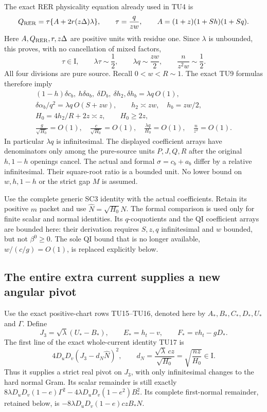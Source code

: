 The exact RER physicality equation already used in TU4 is
\[
 Q_{\rm RER}=\tau\{A+2r(z\Delta)\lambda\},\qquad
 \tau=\frac q{zw},\qquad
 A=(1+z)(1+Sh)(1+Sq).
\]
Here $A,Q_{\rm RER},r,z\Delta$ are positive units with residue one.
Since $\lambda$ is unbounded, this proves, with no cancellation of
mixed factors,
\[
 \tau\in\mathrm I,\qquad \lambda\tau\sim\frac12,\qquad
 \lambda q\sim\frac{zw}{2},\qquad
 \frac n{z^2w}\sim\frac12.                                     \tag{UL2}
\]
All four divisions are pure source. Recall $0<w<R\sim1$.
The exact TU9 formulas therefore imply
\[
\begin{gathered}
 (1-h)\delta c_b,\ h\delta a_b,\ \delta D_b,\
            \delta h_2,\delta h_b=\lambda q\,O(1),\\
 \delta\alpha_b/q^2=\lambda q\,O(S+zw),\qquad
 h_2\asymp zw,\quad h_b=zw/2,\\
 H_0=4h_2/R+2z\asymp z,\qquad H_0\geq2z,\\
 \frac g{\sqrt{H_0}}=O(1),\quad
 \frac c{\sqrt{H_0}}=O(1),\quad
 \frac{\lambda q}{H_0}=O(1),\quad \frac n{z^2}=O(1).
\end{gathered}                                                   \tag{UL3}
\]
In particular $\lambda q$ is infinitesimal. The displayed coefficient
arrays have denominators only among the pure-source units
$P,J,Q,R$ after the original $h,1-h$ openings cancel.
The actual and formal $\sigma=c_b+a_b$ differ by a relative
infinitesimal. Their square-root ratio is a bounded unit.
No lower bound on $w,h,1-h$ or the strict gap $M$ is assumed.

Use the complete generic SC3 identity with the actual coefficients.
Retain its positive $m$ packet and use $\widehat N=\sqrt{H_0}N$.
The formal comparison is used only for finite scalar and normal
identities. Its $q$-coquotients and the QI coefficient arrays are
bounded here: their derivation requires $S,z,q$ infinitesimal and
$w$ bounded, but not $\beta^0\geq0$. The sole QI bound that is no
longer available, $w/(c/g)=O(1)$, is replaced explicitly below.

\subsection{The entire extra current supplies a new angular pivot}

Use the exact positive-chart rows TU15--TU16, denoted here by
$A_*,B_*,C_*,D_*,U_*$ and $\Gamma$. Define
\[
 J_3=\sqrt\lambda(U_*-B_*),\qquad
 E_*=h_t-v,\qquad F_*=vh_t-gD_*.
                                                               \tag{UL4}
\]
The first line of the exact whole-current identity TU17 is
\[
 4D_uD_v\left(J_3-d_N\widehat N\right)^2,\qquad
 d_N=\frac{\sqrt\lambda\,cz}{\sqrt{H_0}}
       =\sqrt{\frac{nz}{H_0}}\in\mathrm I.                       \tag{UL5}
\]
Thus it supplies a strict real pivot on $J_3$, with only
infinitesimal changes to the hard normal Gram. Its scalar
remainder is still exactly
$8\lambda D_uD_v(1-e)\Gamma^2
-4\lambda D_uD_v(1-e^2)B_*^2$.
Its complete first-normal remainder, retained below, is
$-8\lambda D_uD_v(1-e)czB_*N$.

